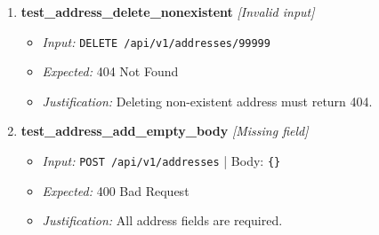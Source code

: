 \documentclass{article}
\begin{document}
\begin{enumerate}[resume, label=\textbf{TC\arabic*.}]
\item \textbf{test\_address\_delete\_nonexistent} \textit{[Invalid input]}
\begin{itemize}[noitemsep]
  \item \textit{Input:} \texttt{DELETE /api/v1/addresses/99999}
  \item \textit{Expected:} 404 Not Found
  \item \textit{Justification:} Deleting non-existent address must return 404.
\end{itemize}

\item \textbf{test\_address\_add\_empty\_body} \textit{[Missing field]}
\begin{itemize}[noitemsep]
  \item \textit{Input:} \texttt{POST /api/v1/addresses} | Body: \texttt{\{\}}
  \item \textit{Expected:} 400 Bad Request
  \item \textit{Justification:} All address fields are required.
\end{itemize}
\end{enumerate}
\end{document}
